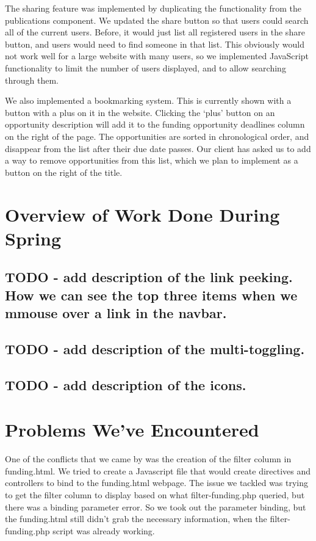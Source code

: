 \documentclass[onecolumn]{IEEEtran}
\begin{document}
The sharing feature was implemented by duplicating the functionality from the publications component. We updated the share button so that users could search all of the current users. Before, it would just list all registered users in the share button, and users would need to find someone in that list. This obviously would not work well for a large website with many users, so we implemented JavaScript functionality to limit the number of users displayed, and to allow searching through them. 

We also implemented a bookmarking system. This is currently shown with a button with a plus on it in the website. Clicking the `plus' button on an opportunity description will add it to the funding opportunity deadlines column on the right of the page. The opportunities are sorted in chronological order, and disappear from the list after their due date passes. Our client has asked us to add a way to remove opportunities from this list, which we plan to implement as a button on the right of the title.

\section{Overview of Work Done During Spring}

\subsection{TODO - add description of the link peeking. How we can see the top three items when we mmouse over a link in the navbar.}


\subsection{TODO - add description of the multi-toggling.}


\subsection{TODO - add description of the icons.}



\section{Problems We've Encountered}
One of the conflicts that we came by was the creation of the filter column in funding.html. We tried to create a Javascript file that would create directives and controllers to bind to the funding.html webpage. The issue we tackled was trying to get the filter column to display based on what filter-funding.php queried, but there was a binding parameter error. So we took out the parameter binding, but the funding.html still didn't grab the necessary information, when the filter-funding.php script was already working. 
\end{document}
